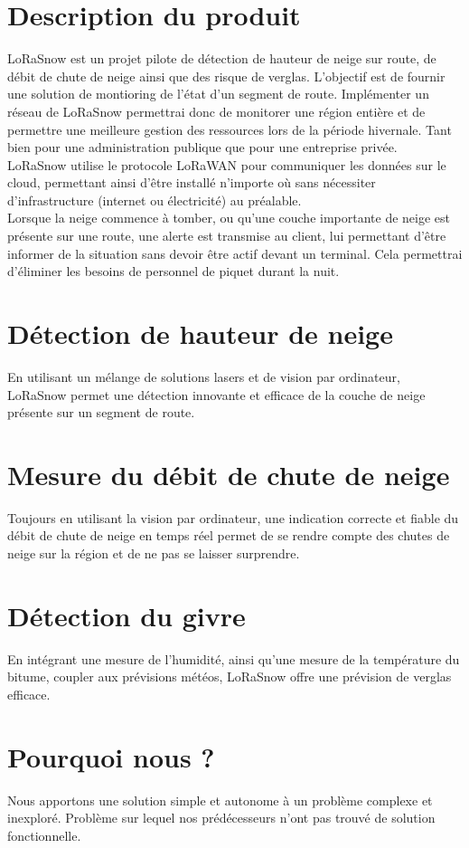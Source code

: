 \section{Description du produit}
LoRaSnow est un projet pilote de détection de hauteur de neige sur route, de débit
de chute de neige ainsi que des risque de verglas.
L'objectif est de fournir une solution de montioring de l'état d'un segment de route.
Implémenter un réseau de LoRaSnow permettrai donc de monitorer une région entière et de permettre
une meilleure gestion des ressources lors de la période hivernale. Tant bien pour une administration
publique que pour une entreprise privée.\\
LoRaSnow utilise le protocole LoRaWAN pour communiquer les données sur le cloud, permettant ainsi
d'être installé n'importe où sans nécessiter d'infrastructure (internet ou électricité) au préalable.\\
Lorsque la neige commence à tomber, ou qu'une couche importante de neige est présente
sur une route, une alerte est transmise au client, lui permettant d'être informer de la situation
sans devoir être actif devant un terminal. Cela permettrai d'éliminer les besoins de personnel
de piquet durant la nuit.


\section{Détection de hauteur de neige}
En utilisant un mélange de solutions lasers et de vision par ordinateur,
LoRaSnow permet une détection innovante et efficace de la couche de neige
présente sur un segment de route.

\section{Mesure du débit de chute de neige}
Toujours en utilisant la vision par ordinateur, une indication correcte et fiable
du débit de chute de neige en temps réel permet de se rendre compte des chutes de neige
sur la région et de ne pas se laisser surprendre.

\section{Détection du givre}
En intégrant une mesure de l'humidité, ainsi qu'une mesure de la température
du bitume, coupler aux prévisions météos, LoRaSnow offre une prévision
de verglas efficace.

\section{Pourquoi nous ?}
Nous apportons une solution simple et autonome à un problème complexe et inexploré.
Problème sur lequel nos prédécesseurs n'ont pas trouvé de solution fonctionnelle.